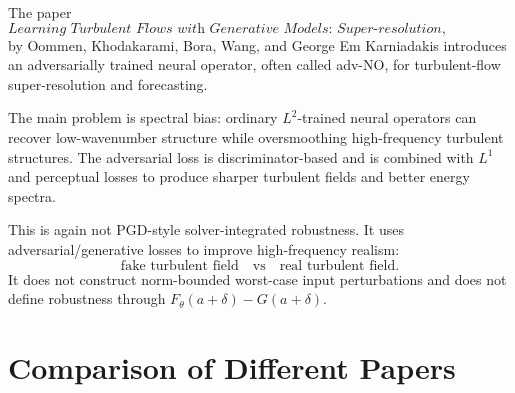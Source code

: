 \documentclass{article}
\begin{document}
The paper
\[
\textit{Learning Turbulent Flows with Generative Models:
Super-resolution, Forecasting, and Sparse Flow Reconstruction}
\]
by Oommen, Khodakarami, Bora, Wang, and George Em Karniadakis introduces an
adversarially trained neural operator, often called adv-NO, for turbulent-flow
super-resolution and forecasting.

The main problem is spectral bias: ordinary \(L^2\)-trained neural operators
can recover low-wavenumber structure while oversmoothing high-frequency
turbulent structures. The adversarial loss is discriminator-based and is
combined with \(L^1\) and perceptual losses to produce sharper turbulent
fields and better energy spectra.

This is again not PGD-style solver-integrated robustness. It uses
adversarial/generative losses to improve high-frequency realism:
\[
\text{fake turbulent field}
\quad\text{vs}\quad
\text{real turbulent field}.
\]
It does not construct norm-bounded worst-case input perturbations and does not
define robustness through \(F_\theta(a+\delta)-G(a+\delta)\).

\section{Comparison of Different Papers}
\end{document}

